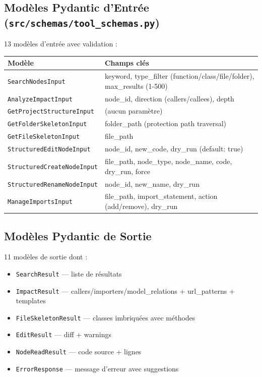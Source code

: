 \documentclass[12pt,a4paper]{article}
\newcommand{\code}[1]{\texttt{#1}}
\begin{document}
\subsection{Modèles Pydantic d'Entrée (\code{src/schemas/tool\_schemas.py})}

13 modèles d'entrée avec validation :

\begin{center}
\begin{tabularx}{\textwidth}{lX}
\toprule
\textbf{Modèle} & \textbf{Champs clés} \\
\midrule
\code{SearchNodesInput} & keyword, type\_filter (function/class/file/folder), max\_results (1-500) \\
\code{AnalyzeImpactInput} & node\_id, direction (callers/callees), depth \\
\code{GetProjectStructureInput} & (aucun paramètre) \\
\code{GetFolderSkeletonInput} & folder\_path (protection path traversal) \\
\code{GetFileSkeletonInput} & file\_path \\
\code{StructuredEditNodeInput} & node\_id, new\_code, dry\_run (default: true) \\
\code{StructuredCreateNodeInput} & file\_path, node\_type, node\_name, code, dry\_run, force \\
\code{StructuredRenameNodeInput} & node\_id, new\_name, dry\_run \\
\code{ManageImportsInput} & file\_path, import\_statement, action (add/remove), dry\_run \\
\bottomrule
\end{tabularx}
\end{center}

\subsection{Modèles Pydantic de Sortie}

11 modèles de sortie dont :

\begin{itemize}
    \item \code{SearchResult} — liste de résultats
    \item \code{ImpactResult} — callers/importers/model\_relations + url\_patterns + templates
    \item \code{FileSkeletonResult} — classes imbriquées avec méthodes
    \item \code{EditResult} — diff + warnings
    \item \code{NodeReadResult} — code source + lignes
    \item \code{ErrorResponse} — message d'erreur avec suggestions
\end{itemize}
\end{document}
